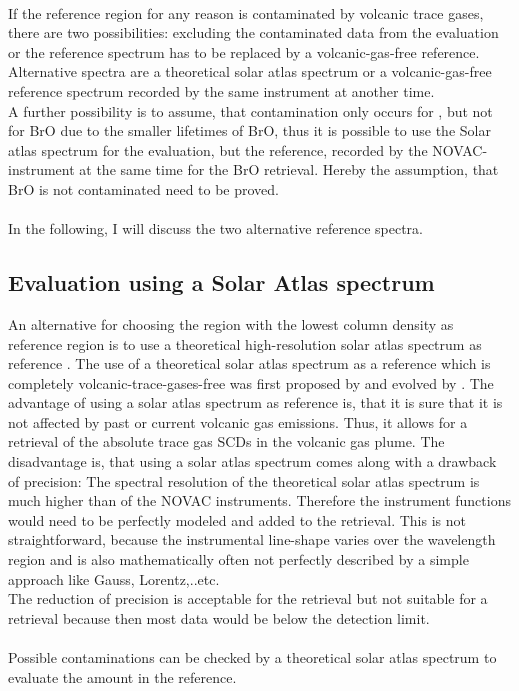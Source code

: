 \\
If the reference region for any reason is
contaminated by volcanic trace gases, there are two possibilities: excluding the contaminated data from the evaluation or the reference spectrum has to be
replaced by a volcanic-gas-free reference. Alternative spectra are a
theoretical solar atlas spectrum or a volcanic-gas-free reference
spectrum recorded by the same instrument at another time.\\
A further possibility is to assume, that contamination only occurs for , but not for BrO due to the smaller lifetimes of BrO, thus it is possible to use the Solar atlas spectrum for the  evaluation, but the reference, recorded by the NOVAC-instrument at the same time for the BrO retrieval. Hereby the assumption, that BrO is not contaminated need to be proved. \\
%
\\
%
In the following, I will discuss the two alternative reference spectra.
%
\subsection*{Evaluation using a Solar Atlas spectrum \label{kuruz}}
An alternative for choosing the region with the lowest column density as reference region is to use a theoretical high-resolution solar atlas spectrum as reference \citep{chance2010improved}.
The use of a theoretical solar atlas spectrum as a reference which is completely volcanic-trace-gases-free was first proposed by \cite{salerno2009novel} and evolved by \citep{lubcke2014bro}.
The advantage of using a solar atlas spectrum as reference is, that it is sure that it is not affected by past or current volcanic gas emissions. Thus, it allows for a retrieval of the absolute trace gas SCDs in the volcanic gas plume. The disadvantage is, that using a solar atlas spectrum comes along with a drawback of precision: The spectral resolution of the theoretical solar atlas spectrum is much higher than of the NOVAC instruments. Therefore the instrument functions would need to be perfectly modeled and added to the retrieval. This is not straightforward, because the instrumental line-shape varies over the wavelength region and is also mathematically often not perfectly described by a simple approach like Gauss, Lorentz,..etc.\\ 
The reduction of precision is acceptable for the
 retrieval but not suitable for a  retrieval because then most data would be below the detection limit.\\
%
\\
%
Possible contaminations can be checked
by a theoretical solar atlas spectrum to evaluate the  amount in the reference.\\

